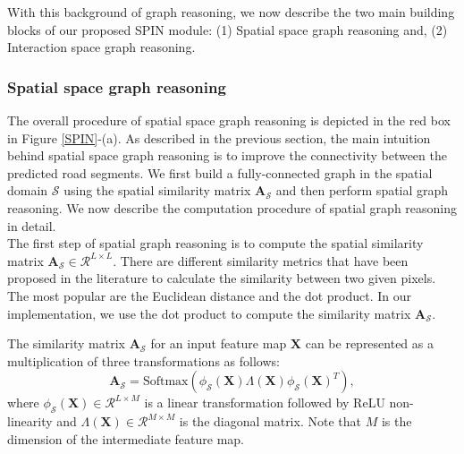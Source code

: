 \documentclass[letterpaper, 10 pt, conference]{ieeeconf}
\begin{document}
With this background of graph reasoning, we now describe the two main building blocks of our proposed SPIN module: (1) Spatial space graph reasoning and, (2) Interaction space graph reasoning.

\subsubsection{Spatial space graph reasoning}
The overall procedure of spatial space graph reasoning is depicted in the red box in Figure \ref{SPIN}-(a). As described in the previous section, the main intuition behind spatial space graph reasoning is to improve the connectivity between the predicted road segments. We first build a fully-connected graph in the spatial domain $\mathcal{S}$ using the spatial similarity matrix $\boldsymbol{A}_{\mathcal{S}}$ and then perform spatial graph reasoning. We now describe the computation procedure of spatial graph reasoning in detail.\\
  The first step of spatial graph reasoning is to compute the spatial similarity matrix $\boldsymbol{A}_{\mathcal{S}} \in \mathcal{R}^{L \times L}$. There are different similarity metrics that have been proposed in the literature to calculate the similarity between two given pixels. The most popular are the Euclidean distance and the dot product. In our implementation, we use the dot product to compute the similarity matrix $ \boldsymbol {A}_{\mathcal{S}} $.

The similarity matrix $\boldsymbol{A}_{\mathcal{S}}$ for an input feature map $\boldsymbol{X}$ can be represented as a multiplication of three transformations as follows:
\begin{equation}
	\boldsymbol{A}_{\mathcal{S}} = \text{Softmax}( \phi_{\mathcal{S}}(\boldsymbol{X}) \Lambda(\boldsymbol{X}) \phi_{\mathcal{S}}(\boldsymbol{X})^{T}),
	\label{similarity}
\end{equation}
where $\phi_{\mathcal{S}}(\boldsymbol{X}) \in \mathcal{R}^{L \times M}$ is a linear transformation followed by ReLU non-linearity and $\Lambda(\boldsymbol{X}) \in \mathcal{R}^{M \times M}$ is the diagonal matrix. Note that $M$ is the dimension of the intermediate feature map.
\end{document}
